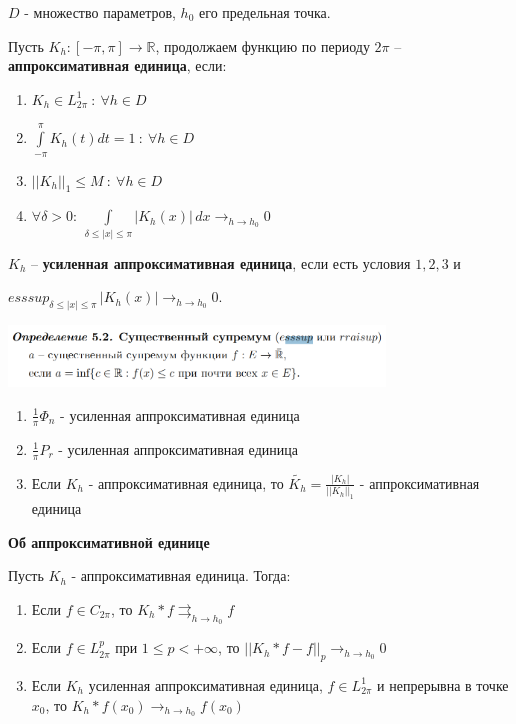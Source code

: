 \begin{definition}
    $D$ - множество параметров, $h_0$ его предельная точка.

    Пусть $K_h: [-\pi, \pi] \to \mathbb{R}$, продолжаем функцию по периоду $2\pi$ -- \textbf{аппроксимативная единица}, если:

    \begin{enumerate}
        \item $K_h \in L_{2\pi}^1 \ : \ \forall h \in D$
        \item $\int\limits_{-\pi}^\pi K_h(t) dt = 1 \ : \ \forall h \in D$
        \item $||K_h||_1 \leqslant M \ : \ \forall h \in D$
        \item $\forall \delta > 0 : \ \int\limits_{\delta \leqslant |x| \leqslant \pi} |K_h (x)| \, dx \rightarrow_{h \to h_0} 0$
    \end{enumerate}

    $K_h$ -- \textbf{усиленная аппроксимативная единица}, если есть условия $1, 2, 3$ и
    
    $esssup_{\delta \leqslant |x| \leqslant \pi} \, |K_h (x)| \rightarrow_{h \to h_0} 0$.

    \begin{center}
        \includegraphics[width=10cm]{assets/05-fourierreihe/esssup-notice.png}
    \end{center}
\end{definition}

\begin{example}
    \begin{enumerate}
        \item $\frac{1}{\pi} \Phi_n$ - усиленная аппроксимативная единица
        \item $\frac{1}{\pi} P_r$ - усиленная аппроксимативная единица
        \item Если $K_h$ - аппроксимативная единица, то $\tilde{K_h} = \frac{|K_h|}{||K_h||_1}$ - аппроксимативная единица
    \end{enumerate}
\end{example}

\begin{theorem}
    \textbf{Об аппроксимативной единице}

    Пусть $K_h$ - аппроксимативная единица. Тогда:

    \begin{enumerate}
        \item Если $f \in C_{2\pi}$, то $K_h * f \rightrightarrows_{h \to h_0} f $
        \item Если $f \in L_{2\pi}^p$ при $1 \leqslant p < +\infty$, то $||K_h * f - f||_p \rightarrow_{h \to h_0} 0 $
        \item Если $K_h$ усиленная аппроксимативная единица, $f \in L_{2\pi}^1$ и непрерывна в точке $x_0$, то $K_h * f (x_0) \rightarrow_{h \to h_0} f(x_0)$
    \end{enumerate}
\end{theorem}

